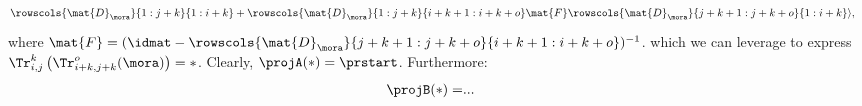 \begin{example}
\begin{equation}
\begin{aligned}
                                             & \rowscols{\mat{D}_\mora}{1:j+k}{1:i+k}+\rowscols{\mat{D}_\mora}{1:j+k}{i+k+1:i+k+o}\mat{F} \rowscols{\mat{D}_\mora}{j+k+1:j+k+o}{1:i+k}\rangle,
        \end{aligned}
    \end{equation}
    where $\mat{F}=(\idmat-\rowscols{\mat{D}_\mora}{j+k+1:j+k+o}{i+k+1:i+k+o})^{-1}$.
    which we can leverage to express $\Tr_{i,j}^{k}\left(\Tr_{i+k,j+k}^o(\mora)\right)=\ast$.
    Clearly, $\projA(\ast)=\prstart$.
    Furthermore:
    \begin{equation*}
        \begin{aligned}
            \projB(\ast)= & .
            ..
        \end{aligned}
    \end{equation*}


\end{example}
